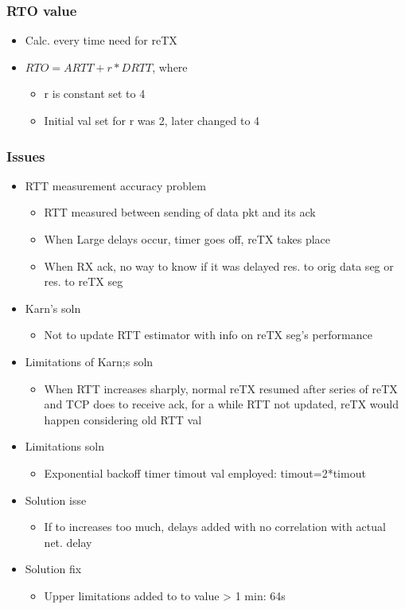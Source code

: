 \subsubsection{RTO value}
\begin{itemize}
	\item Calc. every time need for reTX
	\item $RTO = ARTT+r*DRTT$, where
	\begin{itemize}
		\item r is constant set to 4
		\item Initial val set for r was 2, later changed to 4
	\end{itemize}
\end{itemize}
\subsubsection{Issues}
\begin{itemize}
	\item RTT measurement accuracy problem
	\begin{itemize}
	 	\item RTT measured between sending of data pkt and its ack
		\item When Large delays occur, timer goes off, reTX takes place
		\item When RX ack, no way to know if it was delayed res. to orig data
			seg or res. to reTX seg
	\end{itemize}
	\item Karn's soln
	\begin{itemize}
		\item Not to update RTT estimator with info on reTX seg's
			performance
	\end{itemize}
	\item Limitations of Karn;s soln
	\begin{itemize}
		\item When RTT increases sharply, normal reTX resumed after
			series of reTX and TCP does to receive ack, for a while
			RTT not updated, reTX would happen considering old RTT
			val
	\end{itemize}
	\item Limitations soln
	\begin{itemize}
		\item Exponential backoff timer timout val employed:
			timout=2*timout
	\end{itemize}
	\item Solution isse
		\begin{itemize}
			\item If to increases too much, delays added with no
				correlation with actual net. delay
		\end{itemize}
	\item Solution fix
	\begin{itemize}
		\item Upper limitations added to to value > 1 min: 64s
	\end{itemize}
\end{itemize}
